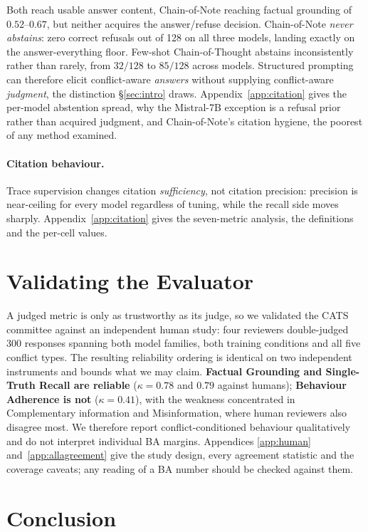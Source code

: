 Both reach usable answer content, Chain-of-Note reaching factual grounding of
$0.52$--$0.67$, but neither acquires the answer/refuse decision. Chain-of-Note
\emph{never abstains}: zero correct refusals out of 128 on all three models,
landing exactly on the answer-everything floor. Few-shot Chain-of-Thought
abstains inconsistently rather than rarely, from $32/128$ to $85/128$ across
models. Structured prompting can therefore elicit conflict-aware \emph{answers}
without supplying conflict-aware \emph{judgment}, the distinction
\S\ref{sec:intro} draws. Appendix~\ref{app:citation} gives the per-model
abstention spread, why the Mistral-7B exception is a refusal prior rather than
acquired judgment, and Chain-of-Note's citation hygiene, the poorest of any
method examined.

\paragraph{Citation behaviour.} Trace supervision changes citation \emph{sufficiency}, not citation precision: precision is near-ceiling for every model regardless of tuning, while the recall side moves sharply. Appendix~\ref{app:citation} gives the seven-metric analysis, the definitions and the per-cell values.

\section{Validating the Evaluator}
\label{sec:human}

A judged metric is only as trustworthy as its judge, so we validated the CATS
committee against an independent human study: four reviewers double-judged 300
responses spanning both model families, both training conditions and all five
conflict types. The resulting reliability ordering is identical on two
independent instruments and bounds what we may claim. \textbf{Factual Grounding
and Single-Truth Recall are reliable} ($\kappa=0.78$ and $0.79$ against humans);
\textbf{Behaviour Adherence is not} ($\kappa=0.41$), with the weakness
concentrated in Complementary information and Misinformation, where human
reviewers also disagree most. We therefore report conflict-conditioned behaviour
qualitatively and do not interpret individual BA margins. Appendices
\ref{app:human} and~\ref{app:allagreement} give the study design, every agreement
statistic and the coverage caveats; any reading of a BA number should be checked
against them.

\section{Conclusion}
\label{sec:conclusion}

